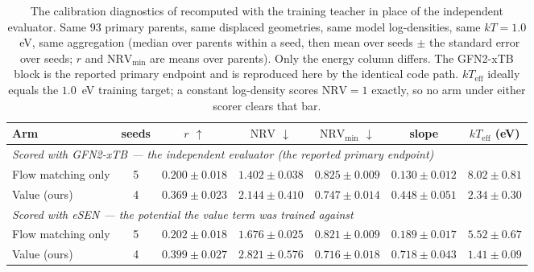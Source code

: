 \begin{table}[h]
\caption{The calibration diagnostics of  recomputed with the
training teacher in place of the independent evaluator. Same 93 primary parents, same
displaced geometries, same model log-densities, same $kT = 1.0$~eV, same
aggregation (median over parents within a seed, then mean over seeds $\pm$ the standard
error over seeds; $r$ and $\mathrm{NRV}_{\min}$ are means over parents). Only the energy
column differs. The GFN2-xTB block is the reported primary endpoint and is reproduced
here by the identical code path. $kT_{\mathrm{eff}}$ ideally equals the $1.0$~eV
training target; a constant log-density scores $\mathrm{NRV} = 1$ exactly, so no arm
under either scorer clears that bar.}
\label{tab:esencalib}
\begin{center}
\footnotesize
\setlength{\tabcolsep}{2.5pt}
\begin{tabular}{lcccccc}
\toprule
Arm & seeds & $r$ $\uparrow$ & $\mathrm{NRV}$ $\downarrow$ & $\mathrm{NRV}_{\min}$ $\downarrow$ & slope & $kT_{\mathrm{eff}}$ (eV) \\
\midrule
\multicolumn{7}{l}{\emph{Scored with GFN2-xTB --- the independent evaluator (the reported primary endpoint)}} \\
Flow matching only & 5 & $0.200 \pm 0.018$ & $1.402 \pm 0.038$ & $0.825 \pm 0.009$ & $0.130 \pm 0.012$ & $8.02 \pm 0.81$ \\
Value (ours)       & 4 & $0.369 \pm 0.023$ & $2.144 \pm 0.410$ & $0.747 \pm 0.014$ & $0.448 \pm 0.051$ & $2.34 \pm 0.30$ \\
\midrule
\multicolumn{7}{l}{\emph{Scored with eSEN --- the potential the value term was trained against}} \\
Flow matching only & 5 & $0.202 \pm 0.018$ & $1.676 \pm 0.025$ & $0.821 \pm 0.009$ & $0.189 \pm 0.017$ & $5.52 \pm 0.67$ \\
Value (ours)       & 4 & $0.399 \pm 0.027$ & $2.821 \pm 0.576$ & $0.716 \pm 0.018$ & $0.718 \pm 0.043$ & $1.41 \pm 0.09$ \\
\bottomrule
\end{tabular}
\end{center}
\end{table}

